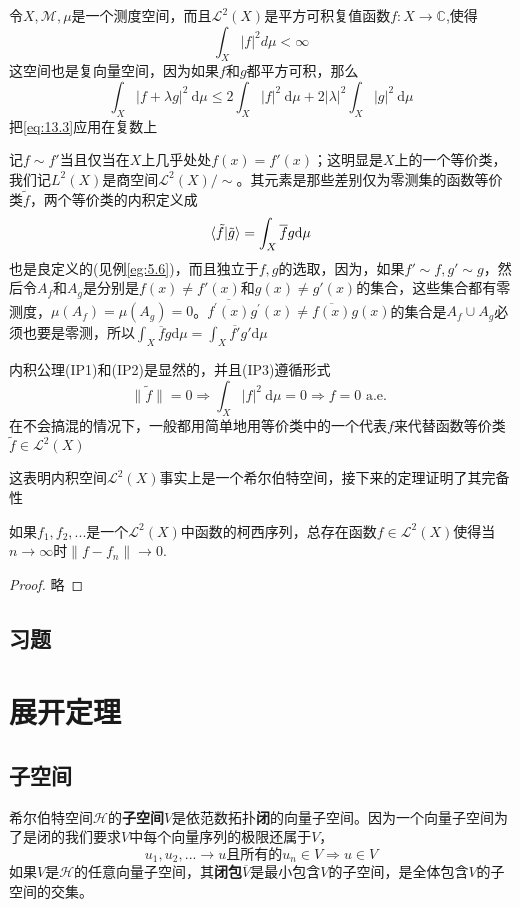 \begin{eg}\label{eg:13.4}
    令\(X,\mathcal{M},\mu\)是一个测度空间，而且\(\mathcal{L}^2(X)\)是平方可积复值函数\(f:X\rightarrow\mathbb{C}\),使得
    \[\int_X\left\lvert f\right\rvert^2d\mu<\infty \]
    这空间也是复向量空间，因为如果\(f\)和\(g\)都平方可积，那么
    $$
\int_{X}|f+\lambda g|^{2} \mathrm{~d} \mu \leq 2 \int_{X}|f|^{2} \mathrm{~d} \mu+2|\lambda|^{2} \int_{X}|g|^{2} \mathrm{~d} \mu
$$
把\ref{eq:13.3}应用在复数上

记\(f \sim f'\)当且仅当在\(X\)上几乎处处\(f(x)=f'(x)\)；这明显是\(X\)上的一个等价类，我们记\(L^2(X)\)是商空间\(\mathcal{L}^2(X)/\sim\)。其元素是那些差别仅为零测集的函数等价类\(\tilde{f}\)，两个等价类的内积定义成
\[\braket{\tilde{f}|\tilde{g}}=\int_X \overline{f}g \mathrm{d}\mu\]
也是良定义的(见例\ref{eg:5.6})，而且独立于\(f,g\)的选取，因为，如果\(f'\sim f,g'\sim g\)，然后令\(A_f\)和\(A_g\)是分别是\(f(x)\neq f'(x)\)和\(g(x)\neq g'(x)\)的集合，这些集合都有零测度，\(\mu(A_f)=\mu(A_g)=0\)。\(\overline{f^{\prime}(x)} g^{\prime}(x) \neq \overline{f(x)} g(x)\)的集合是\(A_f\cup A_g\)必须也要是零测，所以\(\int_X \overline{f}g \mathrm{d}\mu=\int_X \overline{f'}g' \mathrm{d}\mu\)

内积公理(IP1)和(IP2)是显然的，并且(IP3)遵循形式
$$
\|\tilde{f}\|=0 \Longrightarrow \int_{X}|f|^{2} \mathrm{~d} \mu=0 \Longrightarrow f=0 \text { a.e. }
$$
在不会搞混的情况下，一般都用简单地用等价类中的一个代表\(f\)来代替函数等价类\(\tilde{f}\in \mathcal{L}^2(X)\)

这表明内积空间\(\mathcal{L}^2(X)\)事实上是一个希尔伯特空间，接下来的定理证明了其完备性
\end{eg}
\begin{theorem}
    如果\(f_1,f_2,...\)是一个\(\mathcal{L}^2(X)\)中函数的柯西序列，总存在函数\(f\in \mathcal{L}^2(X)\)使得当\(n\rightarrow\infty\)时\(\left\lVert f-f_n\right\rVert \rightarrow0\).
\end{theorem}
\begin{proof}
    略
\end{proof}
\subsection*{习题}
\section{展开定理}
\subsection{子空间}
希尔伯特空间\(\mathcal{H}\)的\textbf{子空间}\(V\)是依范数拓扑\textbf{闭}的向量子空间。因为一个向量子空间为了是闭的我们要求\(V\)中每个向量序列的极限还属于\(V\)，
\[u_1,u_2,...\rightarrow u\text{且所有的}u_n\in V\Longrightarrow u\in V \]
如果\(V\)是\(\mathcal{H}\)的任意向量子空间，其\textbf{闭包}\(\overline{V}\)是最小包含\(V\)的子空间，是全体包含\(V\)的子空间的交集。

